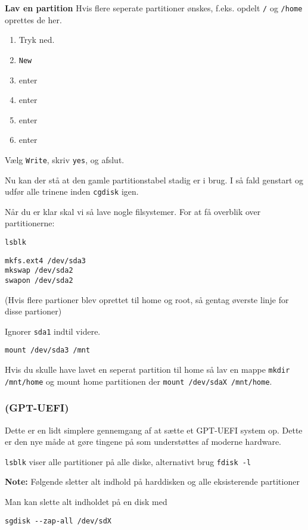 \documentclass[10pt,a4paper,danish]{article}
\newcommand{\note}[1]{\begin{mdframed}[style=note]\textbf{Note:}
    #1\end{mdframed}}
\newcommand{\code}[1]{\colorbox{verbgray}{\texttt{#1}}}
\begin{document}
\textbf{Lav en partition}
Hvis flere seperate partitioner ønskes, f.eks. opdelt \texttt{/} og
\texttt{/home} oprettes de her.
\begin{enumerate}
\item Tryk ned.
\item \texttt{New}
\item enter
\item enter
\item enter
\item enter
\end{enumerate}

Vælg \texttt{Write}, skriv \texttt{yes}, og afslut.

Nu kan der stå at den gamle partitionstabel stadig er i brug. I så fald genstart og udfør alle trinene inden \texttt{cgdisk} igen.

Når du er klar skal vi så lave nogle filsystemer.
For at få overblik over partitionerne:
\begin{verbatim}
lsblk
\end{verbatim}

\begin{verbatim}
mkfs.ext4 /dev/sda3
mkswap /dev/sda2
swapon /dev/sda2
\end{verbatim}
(Hvis flere partioner blev oprettet til home og root, så gentag øverste linje
for disse partioner)

Ignorer \texttt{sda1} indtil videre.

\begin{verbatim}
mount /dev/sda3 /mnt
\end{verbatim}

Hvis du skulle have lavet en seperat partition til home så lav en mappe
\code{mkdir /mnt/home} og mount home partitionen der \code{mount /dev/sdaX
  /mnt/home}.

\newpage
\subsubsection{(GPT-UEFI)}
\label{gpt_uefi}
Dette er en lidt simplere gennemgang af at sætte et GPT-UEFI system op.
Dette er den nye måde at gøre tingene på som understøttes af moderne hardware.

\code{lsblk} viser alle partitioner på alle diske, alternativt brug \code{fdisk -l}

\note{Følgende sletter alt indhold på harddisken og alle eksisterende partitioner}

\begin{mdframed}[style=boxy]
  Man kan slette alt indholdet på en disk med
\begin{verbatim}
sgdisk --zap-all /dev/sdX
\end{verbatim}
\end{mdframed}
\end{document}
